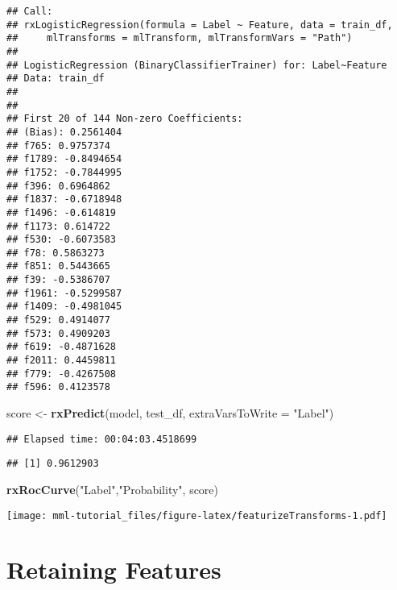 \documentclass[]{book}
\newenvironment{Shaded}{\begin{snugshade}}{\end{snugshade}}
\newcommand{\KeywordTok}[1]{\textcolor[rgb]{0.13,0.29,0.53}{\textbf{#1}}}
\newcommand{\DataTypeTok}[1]{\textcolor[rgb]{0.13,0.29,0.53}{#1}}
\newcommand{\StringTok}[1]{\textcolor[rgb]{0.31,0.60,0.02}{#1}}
\newcommand{\OperatorTok}[1]{\textcolor[rgb]{0.81,0.36,0.00}{\textbf{#1}}}
\newcommand{\NormalTok}[1]{#1}
\theoremstyle{definition}
\theoremstyle{definition}
\theoremstyle{definition}
\theoremstyle{remark}
\begin{document}
\begin{verbatim}
## Call:
## rxLogisticRegression(formula = Label ~ Feature, data = train_df, 
##     mlTransforms = mlTransform, mlTransformVars = "Path")
## 
## LogisticRegression (BinaryClassifierTrainer) for: Label~Feature
## Data: train_df 
## 
## 
## First 20 of 144 Non-zero Coefficients:
## (Bias): 0.2561404
## f765: 0.9757374
## f1789: -0.8494654
## f1752: -0.7844995
## f396: 0.6964862
## f1837: -0.6718948
## f1496: -0.614819
## f1173: 0.614722
## f530: -0.6073583
## f78: 0.5863273
## f851: 0.5443665
## f39: -0.5386707
## f1961: -0.5299587
## f1409: -0.4981045
## f529: 0.4914077
## f573: 0.4909203
## f619: -0.4871628
## f2011: 0.4459811
## f779: -0.4267508
## f596: 0.4123578
\end{verbatim}

\begin{Shaded}
\begin{Highlighting}[]
\NormalTok{score  <-}\StringTok{ }\KeywordTok{rxPredict}\NormalTok{(model, test_df, }\DataTypeTok{extraVarsToWrite =} \StringTok{"Label"}\NormalTok{)}
\end{Highlighting}
\end{Shaded}

\begin{verbatim}
## Elapsed time: 00:04:03.4518699
\end{verbatim}

\begin{Shaded}
\end{Shaded}

\begin{verbatim}
## [1] 0.9612903
\end{verbatim}

\begin{Shaded}
\begin{Highlighting}[]
\KeywordTok{rxRocCurve}\NormalTok{(}\StringTok{"Label"}\NormalTok{,}\StringTok{"Probability"}\NormalTok{, score)}
\end{Highlighting}
\end{Shaded}

\texttt{[image: mml-tutorial\_files/figure-latex/featurizeTransforms-1.pdf]}

\section{Retaining Features}\label{retaining-features}
\end{document}
